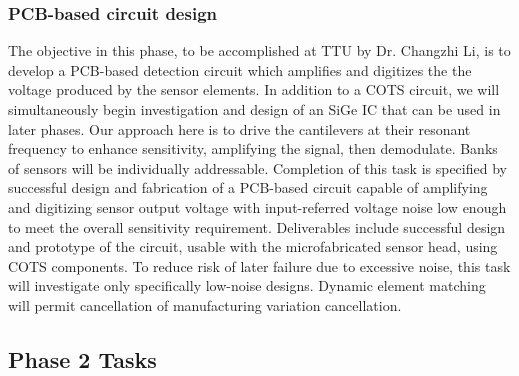 \subsubsection{PCB-based circuit design}\label{sec:p1:cir}

The objective in this phase, to be accomplished at TTU by Dr. Changzhi Li, is to develop a PCB-based detection circuit which amplifies and digitizes the the voltage produced by the sensor elements. In addition to a COTS circuit, we will simultaneously begin investigation and design of an SiGe IC that can be used in later phases. Our approach here is to drive the cantilevers at their resonant frequency to enhance sensitivity, amplifying the signal, then demodulate. Banks of sensors will be individually addressable. Completion of this task is specified by successful design and fabrication of a PCB-based circuit capable of amplifying and digitizing sensor output voltage with input-referred voltage noise low enough to meet the overall sensitivity requirement. Deliverables include successful design and prototype of the circuit, usable with the microfabricated sensor head, using COTS components. To reduce risk of later failure due to excessive noise, this task will investigate only specifically low-noise designs. Dynamic element matching will permit cancellation of manufacturing variation cancellation.

\subsection{Phase 2 Tasks}
  
